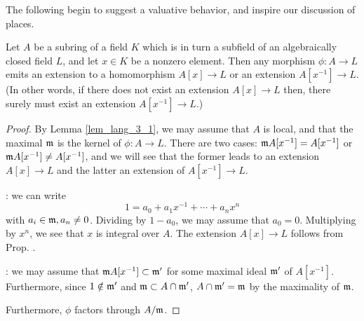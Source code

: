 The following begin to suggest a valuative behavior, and inspire 
our discussion of places.

\begin{prop}\label{thm_lang_3_2}
Let $A$ be a subring of a field $K$ which is in turn a subfield 
of an algebraically closed field $L$, and let $x \in K$ be a 
nonzero element. Then any morphism $\phi: A \to L$ emits an 
extension to a homomorphism $A[x] \to L$ or an extension 
$A[x^{-1}] \to L$. (In other words, if there does not exist an 
extension $A[x] \to L$ then, there surely must exist an extension 
$A[x^{-1}] \to L$.)
\end{prop}
\begin{proof}
By Lemma \ref{lem_lang_3_1}, we may assume that $A$ is local, and
that the maximal $\mathfrak{m}$ is the kernel of $\phi: A \to L$.
There are two cases: $\mathfrak{m}A[x^{-1}] = A[x^{-1}]$ or 
$\mathfrak{m}A[x^{-1}] \neq A[x^{-1}]$, and we will see that the former
leads to an extension $A[x] \to L$ and the latter an extension of
$A[x^{-1}] \to L$.

: we can write
\[
1 = a_0 + a_1x^{-1} + \cdots + a_nx^{n}
\]
with $a_i \in \mathfrak{m}, a_n \neq 0$. Dividing by $1 - a_0$, we 
may assume that $a_0 = 0$. Multiplying by $x^n$, we see that $x$ 
is integral over $A$. The extension $A[x] \to L$ follows from 
Prop. \label{prop_lang_3_1}.

: we may assume 
that $\mathfrak{m}A[x^{-1}] \subset \mathfrak{m'}$ for some maximal 
ideal $\mathfrak{m'}$ of $A[x^{-1}]$. Furthermore, since $1 \notin 
\mathfrak{m'}$ and $\mathfrak{m} \subset A \cap \mathfrak{m'}$, $A \cap 
\mathfrak{m'} = \mathfrak{m}$ by the maximality of $\mathfrak{m}$.

Furthermore, $\phi$ factors through $A/\mathfrak{m}$.
\end{proof}
